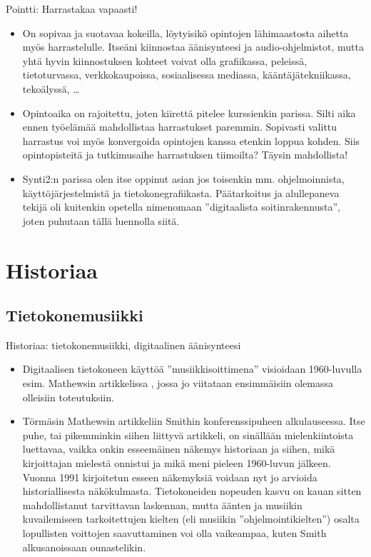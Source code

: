 \documentclass[pdf,10pt,handout]{beamer}
\begin{document}
\begin{frame}{Pointti: Harrastakaa vapaasti!}
  \begin{itemize}
    \item
  On sopivaa ja suotavaa kokeilla, löytyisikö opintojen lähimaastosta
  aihetta myös harrastelulle. Itseäni kiinnostaa äänisynteesi ja
  audio-ohjelmistot, mutta yhtä hyvin kiinnostuksen kohteet voivat
  olla grafiikassa, peleissä, tietoturvassa, verkkokaupoissa,
  sosiaalisessa mediassa, kääntäjätekniikassa, tekoälyssä, \ldots

\item
  Opintoaika on rajoitettu, joten kiirettä pitelee kurssienkin
  parissa. Silti aika ennen työelämää mahdollistaa harrastukset
  paremmin. Sopivasti valittu harrastus voi myös konvergoida opintojen
  kanssa etenkin loppua kohden. Siis opintopisteitä ja tutkimusaihe
  harrastuksen tiimoilta? Täysin mahdollista!

\item
  Synti2:n parissa olen itse oppinut asian jos toisenkin
  mm. ohjelmoinnista, käyttöjärjestelmistä ja tietokonegrafiikasta.
  Päätarkoitus ja alullepaneva tekijä oli kuitenkin opetella
  nimenomaan ''digitaalista soitinrakennusta'', joten puhutaan tällä
  luennolla siitä.
\end{itemize}
\end{frame}

\section{Historiaa}

\subsection{Tietokonemusiikki}
\begin{frame}{Historiaa: tietokonemusiikki, digitaalinen äänisynteesi}
  \begin{itemize}
    \item
  Digitaalisen tietokoneen käyttöä ''musiikkisoittimena'' visioidaan
  1960-luvulla esim. Mathewsin artikkelissa
  \cite{Mathews63thedigital}, jossa jo viitataan ensimmäisiin olemassa
  olleisiin toteutuksiin.

    \item
  Törmäsin Mathewsin artikkeliin Smithin konferenssipuheen
  \cite{smith1991viewpoints} alkulauseessa. Itse puhe, tai pikemminkin siihen
  liittyvä artikkeli, on sinällään mielenkiintoista luettavaa, vaikka
  onkin esseemäinen näkemys historiaan ja siihen, mikä kirjoittajan
  mielestä onnistui ja mikä meni pieleen 1960-luvun jälkeen. Vuonna
  1991 kirjoitetun esseen näkemyksiä voidaan nyt jo arvioida
  historiallisesta näkökulmasta. Tietokoneiden nopeuden kasvu on kauan
  sitten mahdollistanut tarvittavan laskennan, mutta äänten ja
  musiikin kuvailemiseen tarkoitettujen kielten (eli
  musiikin ''ohjelmointikielten'') osalta lopullisten voittojen
  saavuttaminen voi olla vaikeampaa, kuten Smith alkusanoissaan
  ounastelikin.
  \end{itemize}
\end{frame}
\end{document}

